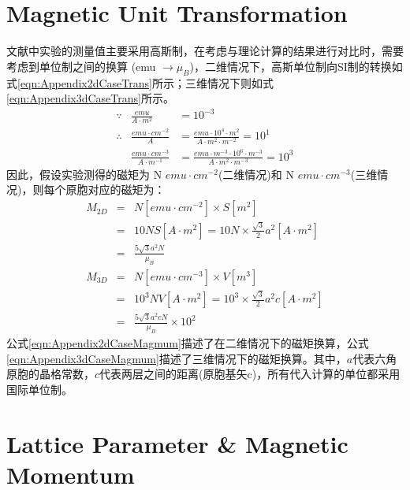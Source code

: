 \documentclass[reprint, aps, prb, showkeys]{revtex4-2}
\begin{document}
\section{Magnetic Unit Transformation}
文献中实验的测量值主要采用高斯制，在考虑与理论计算的结果进行对比时，需要考虑到单位制之间的换算 (emu $\rightarrow \mu_B$)，二维情况下，高斯单位制向SI制的转换如式\ref{eqn:Appendix2dCaseTrans}所示；三维情况下则如式\ref{eqn:Appendix3dCaseTrans}所示。
\begin{subequations}
\begin{eqnarray}
    \because& \frac{emu}{A \cdot m^{2}} &= 10^{-3} \nonumber\\
    \therefore& \frac{emu \cdot cm^{-2}}{A} &= \frac{emu \cdot 10^4 \cdot m^2}{A \cdot m^2 \cdot m^{-2}} = 10^1 \label{eqn:Appendix2dCaseTrans} \\
    &\frac{emu \cdot cm^{-3}}{A \cdot m^{-1}} &= \frac{emu \cdot m^{-3} \cdot 10^6 \cdot m^{-3}}{A \cdot m^2 \cdot m^{-3}} = 10^3 \label{eqn:Appendix3dCaseTrans}
\end{eqnarray}
\end{subequations}
因此，假设实验测得的磁矩为 N $emu \cdot cm^{-2}$(二维情况)和 N $emu \cdot cm^{-3}$(三维情况)，则每个原胞对应的磁矩为：
\begin{subequations}
    \begin{eqnarray}
        M_{2D} &=& N[emu \cdot cm^{-2} ] \times S[m^2] \nonumber \\
        &=& 10 NS [A \cdot m^2] = 10N \times \frac{\sqrt{3}}{2}a^2[A \cdot m^2] \nonumber \\
        &=& \frac{5\sqrt{3}a^2N}{\mu_B} \label{eqn:Appendix2dCaseMagmum}\\
        M_{3D} &=& N[emu \cdot cm^{-3}] \times V[m^3] \nonumber \\
        &=& 10^3 NV [A \cdot m^2] \nonumber = 10^3 \times \frac{\sqrt{3}}{2}a^2c[A \cdot m^2] \nonumber \\
        &=& \frac{5\sqrt{3}a^2cN}{\mu_B} \times 10^2 \label{eqn:Appendix3dCaseMagmum}
    \end{eqnarray}
\end{subequations}
公式\ref{eqn:Appendix2dCaseMagmum}描述了在二维情况下的磁矩换算，公式\ref{eqn:Appendix3dCaseMagmum}描述了三维情况下的磁矩换算。其中，$a$代表六角原胞的晶格常数，$c$代表两层之间的距离(原胞基矢c)，所有代入计算的单位都采用国际单位制。

\section{Lattice Parameter \& Magnetic Momentum}
\end{document}
